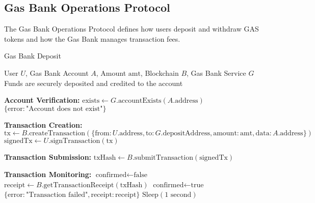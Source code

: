 \subsection{Gas Bank Operations Protocol}
\label{subsec:gas-bank-protocol}

The Gas Bank Operations Protocol defines how users deposit and withdraw GAS tokens and how the Gas Bank manages transaction fees.

\begin{tcolorbox}[
    enhanced,
    colback=blue!5!white,
    colframe=blue!75!black,
    arc=5mm,
    boxrule=1.5pt,
    title=Gas Bank Protocol,
    fonttitle=\bfseries,
    coltitle=white,
    attach boxed title to top left={yshift=-2mm, xshift=5mm},
    boxed title style={colback=blue!75!black, rounded corners},
    shadow={2mm}{-2mm}{0mm}{black!50},
    drop fuzzy shadow
]
\begin{tcolorbox}[
    enhanced,
    colback=blue!5!white,
    colframe=blue!75!black,
    arc=5mm,
    boxrule=1.5pt,
    title=Protocol,
    fonttitle=\bfseries,
    coltitle=white,
    attach boxed title to top left={yshift=-2mm, xshift=5mm},
    boxed title style={colback=blue!75!black, rounded corners},
    shadow={2mm}{-2mm}{0mm}{black!50},
    drop fuzzy shadow
]
\begin{protocol}{Gas Bank Deposit}
\label{prot:gas-bank-deposit}
\begin{algorithmic}[1]
\Require User $U$, Gas Bank Account $A$, Amount $\text{amt}$, Blockchain $B$, Gas Bank Service $G$
\Ensure Funds are securely deposited and credited to the account

\State \textbf{Account Verification:}
\State $\text{exists} \gets G.\text{accountExists}(A.\text{address})$
    \State \Return $\{\text{error}: \text{"Account does not exist"}\}$
\EndIf

\State \textbf{Transaction Creation:}
\State $\text{tx} \gets B.\text{createTransaction}(\{\text{from}: U.\text{address}, \text{to}: G.\text{depositAddress}, \text{amount}: \text{amt}, \text{data}: A.\text{address}\})$
\State $\text{signedTx} \gets U.\text{signTransaction}(\text{tx})$

\State \textbf{Transaction Submission:}
\State $\text{txHash} \gets B.\text{submitTransaction}(\text{signedTx})$

\State \textbf{Transaction Monitoring:}
\State $\text{confirmed} \gets \text{false}$
    \State $\text{receipt} \gets B.\text{getTransactionReceipt}(\text{txHash})$
            \State $\text{confirmed} \gets \text{true}$
            \State \Return $\{\text{error}: \text{"Transaction failed"}, \text{receipt}: \text{receipt}\}$
        \EndIf
    \EndIf
        \State $\text{Sleep}(1\text{ second})$
    \EndIf
\EndWhile


\end{algorithmic}
\end{protocol}
\end{tcolorbox}
\end{tcolorbox}
